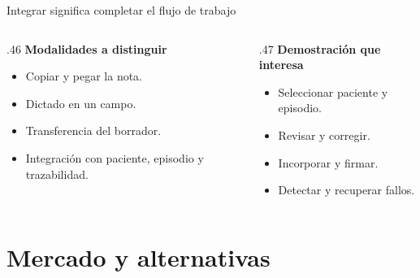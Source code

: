 \documentclass[aspectratio=169,10pt]{beamer}
\begin{document}
\begin{frame}[t]{Integrar significa completar el flujo de trabajo}
\begin{columns}[T,onlytextwidth]
\begin{column}{.46\textwidth}
\textbf{Modalidades a distinguir}
\begin{itemize}
\item Copiar y pegar la nota.
\item Dictado en un campo.
\item Transferencia del borrador.
\item Integración con paciente, episodio y trazabilidad.
\end{itemize}
\end{column}
\begin{column}{.47\textwidth}
\textbf{Demostración que interesa}
\begin{itemize}
\item Seleccionar paciente y episodio.
\item Revisar y corregir.
\item Incorporar y firmar.
\item Detectar y recuperar fallos.
\end{itemize}
\end{column}
\end{columns}
\end{frame}

\section{Mercado y alternativas}
\end{document}
